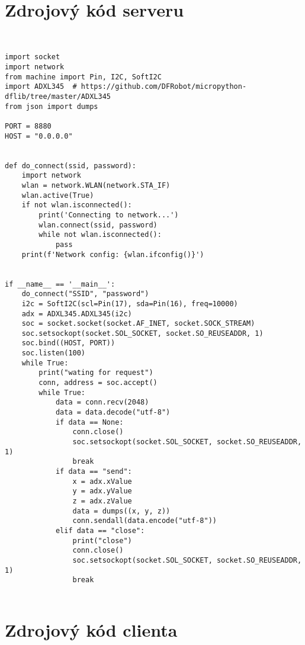 \documentclass[12pt]{report}			%
\begin{document}
		\lipsum[1]
	
	\nocite{*}
    	\printbibliography					
    \printglossary[title={Zkratky}]		
    \listoffigures					
    \listoftables						

    \begin{appendices}
	\chapter{Zdrojový kód serveru}
	
\begin{lstlisting}[title={Program server.py}, caption={server.py},  label={lst:server}]


import socket
import network
from machine import Pin, I2C, SoftI2C
import ADXL345  # https://github.com/DFRobot/micropython-dflib/tree/master/ADXL345
from json import dumps

PORT = 8880
HOST = "0.0.0.0"


def do_connect(ssid, password):
    import network
    wlan = network.WLAN(network.STA_IF)
    wlan.active(True)
    if not wlan.isconnected():
        print('Connecting to network...')
        wlan.connect(ssid, password)
        while not wlan.isconnected():
            pass
    print(f'Network config: {wlan.ifconfig()}')


if __name__ == '__main__':
    do_connect("SSID", "password")
    i2c = SoftI2C(scl=Pin(17), sda=Pin(16), freq=10000)
    adx = ADXL345.ADXL345(i2c)
    soc = socket.socket(socket.AF_INET, socket.SOCK_STREAM)
    soc.setsockopt(socket.SOL_SOCKET, socket.SO_REUSEADDR, 1)
    soc.bind((HOST, PORT))
    soc.listen(100)
    while True:
        print("wating for request")
        conn, address = soc.accept()
        while True:
            data = conn.recv(2048)
            data = data.decode("utf-8")
            if data == None:
                conn.close()
                soc.setsockopt(socket.SOL_SOCKET, socket.SO_REUSEADDR, 1)
                break
            if data == "send":
                x = adx.xValue
                y = adx.yValue
                z = adx.zValue
                data = dumps((x, y, z))
                conn.sendall(data.encode("utf-8"))
            elif data == "close":
                print("close")
                conn.close()
                soc.setsockopt(socket.SOL_SOCKET, socket.SO_REUSEADDR, 1)
                break


\end{lstlisting}

	\chapter{Zdrojový kód clienta}


\end{appendices}
\end{document}
